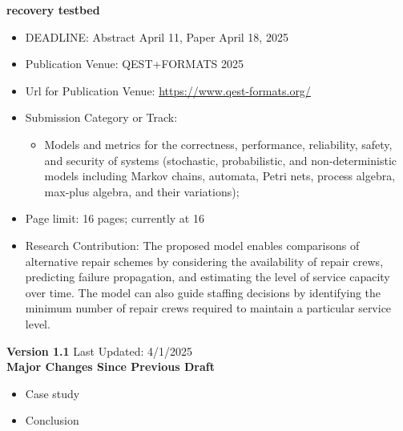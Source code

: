 
\begin{center}
  \textbf{recovery testbed}
\end{center}

\begin{itemize}
  \item DEADLINE: Abstract April 11, Paper April 18, 2025
  \item Publication Venue: QEST+FORMATS 2025
  \item Url for Publication Venue: \url{https://www.qest-formats.org/}
  \item Submission Category or Track:
    \begin{itemize}
        \item Models and metrics for the correctness, performance, reliability, safety, and security of systems (stochastic, probabilistic, and non-deterministic models including Markov chains, automata, Petri nets, process algebra, max-plus algebra, and their variations);
    \end{itemize}
  \item Page limit:  16 pages; currently at 16
  \item Research Contribution: 
   The proposed model enables comparisons of alternative
repair schemes by considering the availability of repair crews,
predicting failure propagation, and estimating the level of
service capacity over time. The model can also guide staffing
decisions by identifying the minimum number of repair crews
required to maintain a particular service level.
\end{itemize}

\vspace{2ex}

\textbf{Version 1.1}
Last Updated: 4/1/2025 \\
\textbf{Major Changes Since Previous Draft}
\begin{itemize}
    \item Case study
    \item Conclusion
\end{itemize}

\vspace{2ex}

